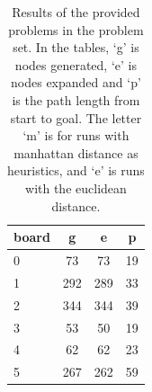 \begin{table}[h]
\begin{minipage}{\textwidth}
\begin{minipage}{0.33\textwidth}
\begin{tabular}{l | c | c | c }
				board 		& g 		& e 		& p 	\\ \hline
				0 			& 73 		& 73 		& 19	\\
				1 			& 292		& 289		& 33	\\
				2 			& 344		& 344		& 39	\\
				3 			& 53		& 50		& 19	\\
				4 			& 62		& 62		& 23	\\
				5 			& 267		& 262		& 59	\\
			\end{tabular}
		\end{minipage}
	\end{minipage}
	\caption{Results of the provided problems in the problem set. In the tables, `g' is nodes generated, `e' is nodes expanded and `p' is the path length from start to goal. The letter `m' is for runs with manhattan distance as heuristics, and `e' is runs with the euclidean distance.}
	\label{table:results}
\end{table}